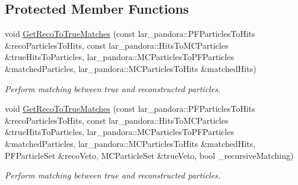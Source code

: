 \subsection*{Protected Member Functions}
\begin{DoxyCompactItemize}
\item 
void \hyperlink{classubxsec_1_1McPfpMatch_adb5138d94990f679643372e0be273940}{Get\-Reco\-To\-True\-Matches} (const lar\-\_\-pandora\-::\-P\-F\-Particles\-To\-Hits \&reco\-Particles\-To\-Hits, const lar\-\_\-pandora\-::\-Hits\-To\-M\-C\-Particles \&true\-Hits\-To\-Particles, lar\-\_\-pandora\-::\-M\-C\-Particles\-To\-P\-F\-Particles \&matched\-Particles, lar\-\_\-pandora\-::\-M\-C\-Particles\-To\-Hits \&matched\-Hits)
\begin{DoxyCompactList}\small\item\em Perform matching between true and reconstructed particles. \end{DoxyCompactList}\item 
void \hyperlink{classubxsec_1_1McPfpMatch_a0d41e3e0c60f2777cc26ca8b8520e9d2}{Get\-Reco\-To\-True\-Matches} (const lar\-\_\-pandora\-::\-P\-F\-Particles\-To\-Hits \&reco\-Particles\-To\-Hits, const lar\-\_\-pandora\-::\-Hits\-To\-M\-C\-Particles \&true\-Hits\-To\-Particles, lar\-\_\-pandora\-::\-M\-C\-Particles\-To\-P\-F\-Particles \&matched\-Particles, lar\-\_\-pandora\-::\-M\-C\-Particles\-To\-Hits \&matched\-Hits, P\-F\-Particle\-Set \&reco\-Veto, M\-C\-Particle\-Set \&true\-Veto, bool \-\_\-recursive\-Matching)
\begin{DoxyCompactList}\small\item\em Perform matching between true and reconstructed particles. \end{DoxyCompactList}\end{DoxyCompactItemize}

